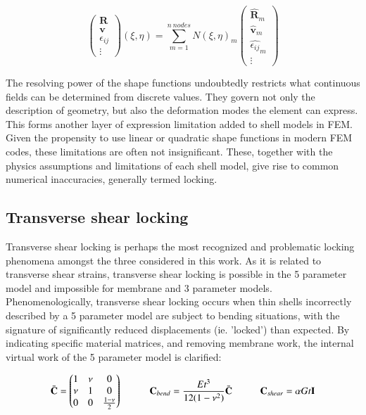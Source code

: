 \singlespacing
\begin{equation} 
\begin{pmatrix}
\mathbf{R} \\
\mathbf{v} \\
\epsilon_{ij} \\
\vdots
\end{pmatrix}
(\xi,\eta)
=
\sum_{m=1}^{n\ nodes}
N(\xi,\eta)_m
{\begin{pmatrix}
	\hat{\mathbf{R}}_m \\
	\hat{\mathbf{v}}_m \\
	\hat{\epsilon_{ij}}_m \\
	\vdots
	\end{pmatrix}}
\label{eqfemtech1}
\end{equation}

\doublespacing

The resolving power of the shape functions undoubtedly restricts what continuous fields can be determined from discrete values. They govern not only the description of geometry, but also the deformation modes the element can express. This forms another layer of expression limitation added to shell models in FEM. Given the propensity to use linear or quadratic shape functions in modern FEM codes, these limitations are often not insignificant. These, together with the physics assumptions and limitations of each shell model, give rise to common numerical inaccuracies, generally termed locking.

\subsection{Transverse shear locking} \label{transverse_shear_locking}

Transverse shear locking is perhaps the most recognized and problematic locking phenomena amongst the three considered in this work. As it is related to transverse shear strains, transverse shear locking is possible  in the 5 parameter model and impossible for membrane and 3 parameter models. Phenomenologically, transverse shear locking occurs when thin shells incorrectly described by a 5 parameter model are subject to bending situations, with the signature of significantly reduced displacements (ie. 'locked') than expected. By indicating specific material matrices, and removing membrane work, the internal virtual work of the 5 parameter model is clarified: 

\singlespacing
\begin{equation} 
\bar{\mathbf{C}} =
\begin{pmatrix}
1 & \nu & 0 \\
\nu & 1 & 0 \\
0 & 0 & \frac{1-\nu}{2}
\end{pmatrix}
\hspace{10mm}
\mathbf{C}_{bend} = \frac{E t^3}{12(1-\nu^2)} \bar{ \mathbf{C}}
\hspace{10mm}
\mathbf{C}_{shear} = \alpha G t \mathbf{I}
\label{eqlock1}
\end{equation}

